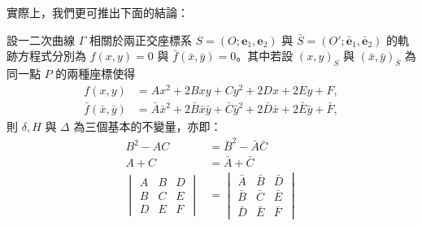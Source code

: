 實際上，我們更可推出下面的結論：

\begin{theorem}[剛性運動下不變量定理]
設一二次曲線 $\Gamma$ 相關於兩正交座標系 $S = (O; \mathbf{e}_1, \mathbf{e}_2)$ 與 $\bar{S} = (O'; \bar{\mathbf{e}}_1, \bar{\mathbf{e}}_2)$ 的軌跡方程式分別為 $f(x, y) = 0$ 與 $\bar{f}(\bar{x}, \bar{y}) = 0$。其中若設 $(x, y)_S$ 與 $(\bar{x}, \bar{y})_{\bar{S}}$ 為同一點 $P$ 的兩種座標使得
\begin{align*}
f(x, y) &= Ax^2 + 2Bxy + Cy^2 + 2Dx + 2Ey + F, \\
\bar{f}(\bar{x}, \bar{y}) &= \bar{A}\bar{x}^2 + 2\bar{B}\bar{x}\bar{y} + \bar{C}\bar{y}^2 + 2\bar{D}\bar{x} + 2\bar{E}\bar{y} + \bar{F},
\end{align*}
則 $\delta, H$ 與 $\Delta$ 為三個基本的不變量，亦即：
\begin{equation}
\begin{aligned}
B^2 - AC &= \bar{B}^2 - \bar{A}\bar{C} \\
A + C &= \bar{A} + \bar{C} \\
\begin{vmatrix} A & B & D \\ B & C & E \\ D & E & F \end{vmatrix} &= \begin{vmatrix} \bar{A} & \bar{B} & \bar{D} \\ \bar{B} & \bar{C} & \bar{E} \\ \bar{D} & \bar{E} & \bar{F} \end{vmatrix}
\end{aligned}
\label{eq:b4s-ch4-thm3-invariants}
\end{equation}
\end{theorem}

